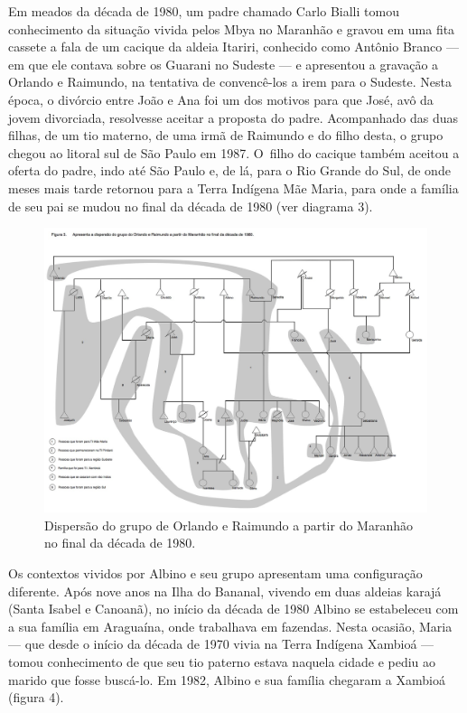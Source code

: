 Em meados da década de 1980, um padre chamado Carlo Bialli tomou
conhecimento da situação vivida pelos Mbya no Maranhão e gravou em uma
fita cassete a fala de um cacique da aldeia Itariri, conhecido como
Antônio Branco --- em que ele contava sobre os Guarani no Sudeste --- e
apresentou a gravação a Orlando e Raimundo, na tentativa de
convencê-los a irem para o Sudeste. Nesta época, o divórcio entre João
e Ana foi um dos motivos para que José, avô da jovem divorciada,
resolvesse aceitar a proposta do padre. Acompanhado das duas filhas, de
um tio materno, de uma irmã de Raimundo e do filho desta, o grupo
chegou ao litoral sul de São Paulo em 1987. O~filho do cacique também
aceitou a oferta do padre, indo até São Paulo e, de lá, para o Rio
Grande do Sul, de onde meses mais tarde retornou para a Terra Indígena
Mãe Maria, para onde a família de seu pai se mudou no final da década
de 1980 (ver diagrama 3).

\begin{figure}
  \centering
 \includegraphics[width=\textwidth]{./img/GUARANIS-img11.jpg}	
  \hfill
  \caption{Dispersão do grupo de Orlando e Raimundo a partir do Maranhão no final da década de 1980.}
\end{figure}
 
 

Os contextos vividos por Albino e seu grupo apresentam uma configuração
diferente. Após nove anos na Ilha do Bananal, vivendo em duas aldeias
karajá (Santa Isabel e Canoanã), no início da década de 1980 Albino se
estabeleceu com a sua família em Araguaína, onde trabalhava em
fazendas. Nesta ocasião, Maria --- que desde o início da década de 1970
vivia na Terra Indígena Xambioá --- tomou conhecimento de que seu tio
paterno estava naquela cidade e pediu ao marido que fosse buscá-lo. Em
1982, Albino e sua família chegaram a Xambioá (figura 4). 

